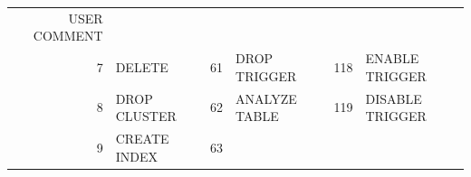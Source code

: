 \begin{appendix}
\begin{longtable}[]{@{}rl|rl|rl@{}}
\begin{minipage}[t]{0.24\columnwidth}
USER COMMENT\strut
\end{minipage}\tabularnewline
\begin{minipage}[t]{0.06\columnwidth}\raggedright\strut
7\strut
\end{minipage} & \begin{minipage}[t]{0.19\columnwidth}\raggedright\strut
DELETE\strut
\end{minipage} & \begin{minipage}[t]{0.06\columnwidth}\raggedright\strut
61\strut
\end{minipage} & \begin{minipage}[t]{0.24\columnwidth}\raggedright\strut
DROP TRIGGER\strut
\end{minipage} & \begin{minipage}[t]{0.06\columnwidth}\raggedright\strut
118\strut
\end{minipage} & \begin{minipage}[t]{0.24\columnwidth}\raggedright\strut
ENABLE TRIGGER\strut
\end{minipage}\tabularnewline
\begin{minipage}[t]{0.06\columnwidth}\raggedright\strut
8\strut
\end{minipage} & \begin{minipage}[t]{0.19\columnwidth}\raggedright\strut
DROP CLUSTER\strut
\end{minipage} & \begin{minipage}[t]{0.06\columnwidth}\raggedright\strut
62\strut
\end{minipage} & \begin{minipage}[t]{0.24\columnwidth}\raggedright\strut
ANALYZE TABLE\strut
\end{minipage} & \begin{minipage}[t]{0.06\columnwidth}\raggedright\strut
119\strut
\end{minipage} & \begin{minipage}[t]{0.24\columnwidth}\raggedright\strut
DISABLE TRIGGER\strut
\end{minipage}\tabularnewline
\begin{minipage}[t]{0.06\columnwidth}\raggedright\strut
9\strut
\end{minipage} & \begin{minipage}[t]{0.19\columnwidth}\raggedright\strut
CREATE INDEX\strut
\end{minipage} & \begin{minipage}[t]{0.06\columnwidth}\raggedright\strut
63\strut
\end{minipage} & \begin{minipage}[t]{0.24\columnwidth}\raggedright\strut

\end{minipage}
\end{longtable}
\end{appendix}

